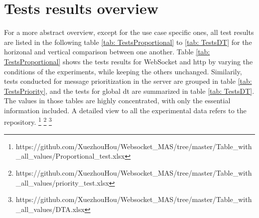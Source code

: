 \section{Tests results overview}

For a more abstract overview, except for the use case specific ones, all 
test results are listed in the following table \ref{tab: TestsProportional} to 
\ref{tab: TestsDT} for the horizonal and vertical comparison between 
one another. Table \ref{tab: TestsProportional} shows the tests results for 
WebSocket and \gls{http} by varying the conditions of the experiments, 
while keeping the others unchanged. Similarily, tests conducted for message 
prioritization in the server are grouped in table \ref{tab: TestsPriority}, 
and the tests for global \gls{dt} are summarized in table \ref{tab: TestsDT}. 
The values in those tables are highly concentrated, with only the essential 
information included. A detailed view to all the experimental data refers to 
the repository. 
\footnote[3]{https://github.com/XuezhouHou/Websocket\_MAS/tree/master/Table\_with\_all\_values/Proportional\_test.xlsx}
\footnote[4]{https://github.com/XuezhouHou/Websocket\_MAS/tree/master/Table\_with\_all\_values/priority\_test.xlsx}
\footnote[5]{https://github.com/XuezhouHou/Websocket\_MAS/tree/master/Table\_with\_all\_values/DTA.xlsx}


